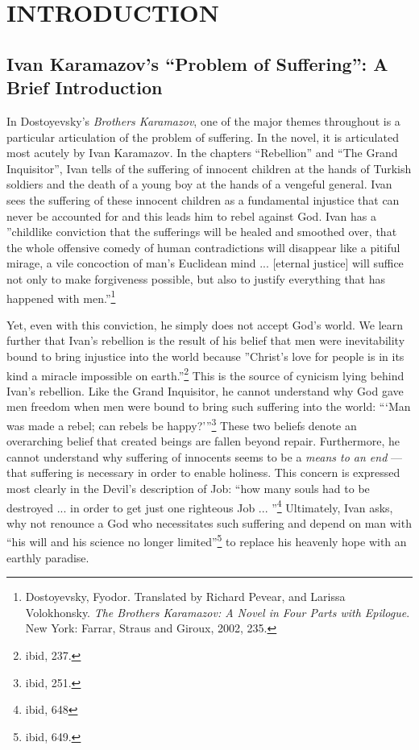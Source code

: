 \tableofcontents
\chapter{INTRODUCTION}

\pagestyle{myheadings}

\label{introduction}
	\section{Ivan Karamazov's ``Problem of Suffering'': A Brief Introduction}
	In Dostoyevsky's \emph{Brothers Karamazov}, one of the major themes throughout is a particular articulation of the problem of suffering. In the novel, it is articulated most acutely by Ivan Karamazov. In the chapters ``Rebellion'' and ``The Grand Inquisitor'', Ivan tells of the suffering of innocent children at the hands of Turkish soldiers and the death of a young boy at the hands of a vengeful general. Ivan sees the suffering of these innocent children as a fundamental injustice that can never be accounted for and this leads him to rebel against God. Ivan has a ''childlike conviction that the sufferings will be healed and smoothed over, that the whole offensive comedy of human contradictions will disappear like a pitiful mirage, a vile concoction of man's Euclidean mind ... [eternal justice] will suffice not only to make forgiveness possible, but also to justify everything that has happened with men.''\footnote{Dostoyevsky, Fyodor. Translated by Richard Pevear, and Larissa Volokhonsky. \emph{The Brothers Karamazov: A Novel in Four Parts with Epilogue}. New York: Farrar, Straus and Giroux, 2002, 235.}

	Yet, even with this conviction, he simply does not accept God's world. We learn further that Ivan's rebellion is the result of his belief that men were inevitability bound to bring injustice into the world because ''Christ's love for people is in its kind a miracle impossible on earth.''\footnote{ibid, 237.} This is the source of cynicism lying behind Ivan's rebellion. Like the Grand Inquisitor, he cannot understand why God gave men freedom when men were bound to bring such suffering into the world: ```Man was made a rebel; can rebels be happy?'''\footnote{ibid, 251.} These two beliefs denote an overarching belief that created beings are fallen beyond repair. Furthermore, he cannot understand why suffering of innocents seems to be a \emph{means to an end} --- that suffering is necessary in order to enable holiness. This concern is expressed most clearly in the Devil's description of Job: ``how many souls had to be destroyed ... in order to get just one righteous Job ... ''\footnote{ibid, 648} Ultimately, Ivan asks, why not renounce a God who necessitates such suffering and depend on man with ``his will and his science no longer limited''\footnote{ibid, 649.} to replace his heavenly hope with an earthly paradise.

